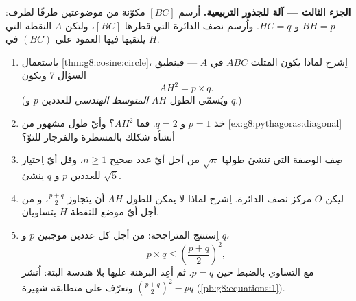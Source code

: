 \begin{problem}[{مسألة نهاية الأسبوع --- اِرتفاع المثلث القائم
الزاوية: $AB^2 = BH \times BC$ و $AH^2 = BH \times HC$، وبرهان ثانٍ
لفيثاغورس، وآلة لإنشاء الجذور التربيعية}]
\medskip
\noindent\textbf{الجزء الثالث --- آلة للجذور التربيعية.}
اُرسم  $[BC]$ مكوّنة من  موضوعتين طرفًا لطرف:
$BH = p$ و $HC = q$. واُرسم نصف الدائرة التي قطرها $[BC]$،
ولتكن $A$ النقطة التي يلتقيها فيها العمود على $(BC)$ في $H$.
\begin{enumerate}[resume]
  \item باستعمال \cref{thm:g8:cosine:circle}، اِشرح لماذا يكون
        المثلث $ABC$  في $A$ --- فينطبق السؤال 7
        ويكون
        \[
        AH^2 = p \times q .
        \]
        (ويُسمّى الطول $AH$ \emph{المتوسط
        الهندسي} للعددين $p$ و $q$.)
  \item خذ $p = 1$ و $q = 2$. فما $AH^2$؟ وأيّ طول
        مشهور من \cref{ex:g8:pythagoras:diagonal} أنشأه
        شكلك بالمسطرة والفرجار للتوّ؟
  \item صِف الوصفة التي تنشئ  طولها
        $\sqrt n$ من أجل أيّ عدد صحيح $n \geq 1$، وقل أيّ
        اِختيار للعددين $p$ و $q$ ينشئ $\sqrt 5$.
  \item ليكن $O$ مركز نصف الدائرة. اِشرح لماذا لا يمكن
        للطول $AH$ أن يتجاوز  $\frac{p + q}{2}$، و
        من أجل أيّ موضع للنقطة $H$ يتساويان.
  \item اِستنتج المتراجحة: من أجل كل عددين موجبين $p$ و
        $q$،
        \[
        p \times q \leq \left(\frac{p + q}{2}\right)^2,
        \]
        مع التساوي بالضبط حين $p = q$. ثم أعِد البرهنة عليها
        بلا هندسة البتة: اُنشر
        $\left(\frac{p+q}{2}\right)^2 - p q$ وتعرّف على
        متطابقة شهيرة (\cref{pb:g8:equations:1}).
\end{enumerate}
\end{problem}

